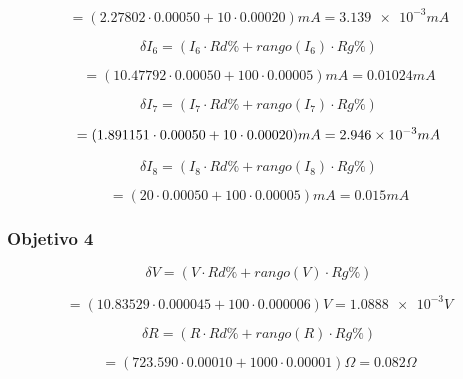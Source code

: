 \documentclass[DIV=calc, paper=a4, fontsize=11pt]{scrartcl}
\begin{document}
\begin{multicols}{2}
\begin{equation*}
    = (2.27802 \cdot 0.00050 + 10 \cdot 0.00020 ) mA = \num{3.139e-3} mA
\end{equation*}

\begin{equation*}
    \delta I_6 = (I_6 \cdot Rd\% + rango(I_6) \cdot Rg\%) 
\end{equation*}

\begin{equation*}
    = (10.47792 \cdot 0.00050 + 100 \cdot 0.00005 ) mA = 0.01024 mA
\end{equation*}

\begin{equation*}
    \delta I_7 = (I_7 \cdot Rd\% + rango(I_7) \cdot Rg\%) 
\end{equation*}

\begin{equation*}
    = (1.891151 \cdot 0.00050 + 10 \cdot 0.00020 ) mA = \num{2.946 e -3} mA
\end{equation*}

\begin{equation*}
    \delta I_8 = (I_8 \cdot Rd\% + rango(I_8) \cdot Rg\%) 
\end{equation*}

\begin{equation*}
    = (20 \cdot 0.00050 + 100 \cdot 0.00005 ) mA = \num{0.015} mA
\end{equation*}



\subsubsection*{Objetivo 4}

\begin{equation*}
    \delta V = (V \cdot Rd\% + rango(V) \cdot Rg\%) 
\end{equation*}

\begin{equation*}
    = (10.83529 \cdot 0.000045 + 100 \cdot 0.000006 ) V = \num{1.0888e-3} V
\end{equation*}

\begin{equation*}
    \delta R = (R \cdot Rd\% + rango(R) \cdot Rg\%) 
\end{equation*}

\begin{equation*}
    = (723.590 \cdot 0.00010 + 1000 \cdot 0.00001 ) \Omega = 0.082 \Omega
\end{equation*}






\end{multicols}
\end{document}
